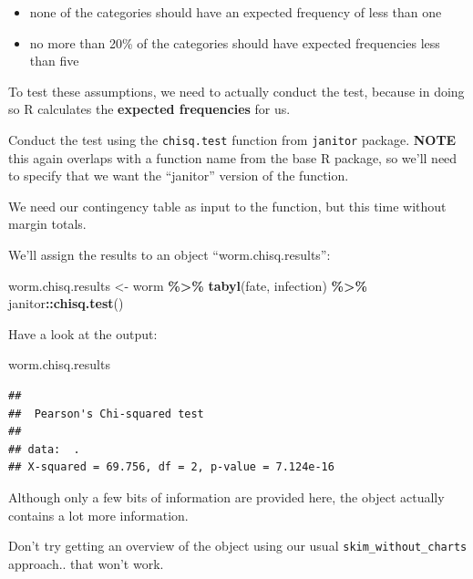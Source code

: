 \documentclass[
]{book}
\newenvironment{Shaded}{\begin{snugshade}}{\end{snugshade}}
\newcommand{\FunctionTok}[1]{\textcolor[rgb]{0.13,0.29,0.53}{\textbf{#1}}}
\newcommand{\NormalTok}[1]{#1}
\newcommand{\OtherTok}[1]{\textcolor[rgb]{0.56,0.35,0.01}{#1}}
\newcommand{\SpecialCharTok}[1]{\textcolor[rgb]{0.81,0.36,0.00}{\textbf{#1}}}
\providecommand{\tightlist}{%
  \setlength{\itemsep}{0pt}\setlength{\parskip}{0pt}}
\begin{document}
\begin{itemize}
\tightlist
\item
  none of the categories should have an expected frequency of less than one
\item
  no more than 20\% of the categories should have expected frequencies less than five
\end{itemize}

To test these assumptions, we need to actually conduct the test, because in doing so R calculates the \textbf{expected frequencies} for us.

Conduct the test using the \texttt{chisq.test} function from \texttt{janitor} package. \textbf{NOTE} this again overlaps with a function name from the base R package, so we'll need to specify that we want the ``janitor'' version of the function.

We need our contingency table as input to the function, but this time without margin totals.

We'll assign the results to an object ``worm.chisq.results'':

\begin{Shaded}
\begin{Highlighting}[]
\NormalTok{worm.chisq.results }\OtherTok{\textless{}{-}}\NormalTok{ worm }\SpecialCharTok{\%\textgreater{}\%}
    \FunctionTok{tabyl}\NormalTok{(fate, infection) }\SpecialCharTok{\%\textgreater{}\%}
\NormalTok{    janitor}\SpecialCharTok{::}\FunctionTok{chisq.test}\NormalTok{()}
\end{Highlighting}
\end{Shaded}

Have a look at the output:

\begin{Shaded}
\begin{Highlighting}[]
\NormalTok{worm.chisq.results}
\end{Highlighting}
\end{Shaded}

\begin{verbatim}
## 
##  Pearson's Chi-squared test
## 
## data:  .
## X-squared = 69.756, df = 2, p-value = 7.124e-16
\end{verbatim}

Although only a few bits of information are provided here, the object actually contains a lot more information.

Don't try getting an overview of the object using our usual \texttt{skim\_without\_charts} approach.. that won't work.
\end{document}
